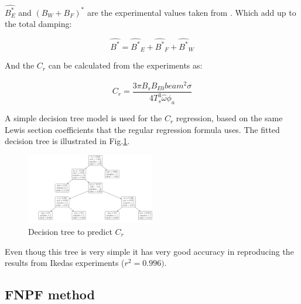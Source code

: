     $\hat{B_E^*}$ and $(B_W+B_F)^*$ are the experimental values taken
from \citep{7505983/4AFVVGNT}. Which add up to the total damping:
 
            
    
    \begin{equation}
\hat{B^*} = \hat{B^*}_{E} + \hat{B^*}_{F} + \hat{B^*}_{W}
\label{eq:B_star_hat}
\end{equation}

    

    And the $C_r$ can be calculated from the experiments as:
 
            
    
    \begin{equation}
C_{r} = \frac{3 \pi B_{s} \hat{B}_{E0} beam^{2} \sigma}{4 T_{s}^{3} \hat{\omega} \phi_{a}}
\label{eq:C_r_2}
\end{equation}

    

    A simple decision tree model is used for the $C_r$ regression, based
on the same Lewis section coefficients that the regular regression
formula uses. The fitted decision tree is illustrated in
Fig.\ref{fig:decision_tree}.

    

    \begin{figure}[H]
        \begin{center}\includegraphics[width = 0.5\textwidth]{figures/decision_tree.pdf}\end{center}
        \vspace{-1cm}
        \caption{Decision tree to predict $C_r$}
        \label{fig:decision_tree}
    \end{figure}
    
    Even thoug this tree is very simple it has very good accuracy in
reproducing the results from Ikedas experiments ($r^2=0.996)$.

    \subsection*{FNPF method}\label{fnpf-method}

